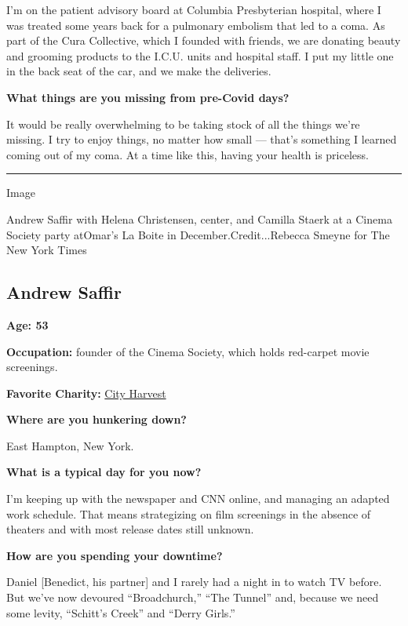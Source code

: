 I'm on the patient advisory board at Columbia Presbyterian hospital,
where I was treated some years back for a pulmonary embolism that led to
a coma. As part of the Cura Collective, which I founded with friends, we
are donating beauty and grooming products to the I.C.U. units and
hospital staff. I put my little one in the back seat of the car, and we
make the deliveries.

\textbf{What things are you missing from pre-Covid days?}

It would be really overwhelming to be taking stock of all the things
we're missing. I try to enjoy things, no matter how small --- that's
something I learned coming out of my coma. At a time like this, having
your health is priceless.

\begin{center}\rule{0.5\linewidth}{\linethickness}\end{center}

Image

Andrew Saffir with Helena Christensen, center, and Camilla Staerk at a
Cinema Society party atOmar's La Boite in December.Credit...Rebecca
Smeyne for The New York Times

\hypertarget{andrew-saffir}{%
\subsection{Andrew Saffir}\label{andrew-saffir}}

\textbf{Age: 53}

\textbf{Occupation:} founder of the Cinema Society, which holds
red-carpet movie screenings.

\textbf{Favorite Charity:} \href{https://www.cityharvest.org}{City
Harvest}

\textbf{Where are you hunkering down?}

East Hampton, New York.

\textbf{What is a typical day for you now?}

I'm keeping up with the newspaper and CNN online, and managing an
adapted work schedule. That means strategizing on film screenings in the
absence of theaters and with most release dates still unknown.

\textbf{How are you spending your downtime?}

Daniel {[}Benedict, his partner{]} and I rarely had a night in to watch
TV before. But we've now devoured ``Broadchurch,'' ``The Tunnel'' and,
because we need some levity, ``Schitt's Creek'' and ``Derry Girls.''

